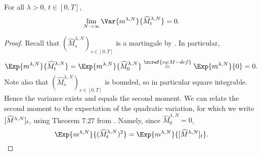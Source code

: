 \documentclass{article}
\begin{document}
\begin{proposition}\label{prop:vanishing-variance}  %
  For all $\lambda > 0$, $t \in [0,T]$,
  \begin{equation}
    \lim_{N\to\infty} \Var{\lawmu^{\lambda,N}}{\widehat{M}_t^{\lambda,N}} = 0.
  \end{equation}
\end{proposition}
\begin{proof}
  Recall that $(\widehat{M}_s^{\lambda,N})_{s\in[0,T]}$ is a martingale by .
  In particular,
  \begin{equation}
    \Exp{\lawmu^{\lambda,N}}{\widehat{M}_t^{\lambda,N}} = \Exp{\lawmu^{\lambda,N}}{\widehat{M}_0^{\lambda,N}}
    \overset{\zcref{eq:M-def}}{=} \Exp{\lawmu^{\lambda,N}}{0} = 0.
  \end{equation}
  Note also that $(\widehat{M}_s^{\lambda,N})_{s\in[0,T]}$ is bounded, so in particular square integrable.
  Hence the variance exists and equals the second moment.
  We can relate the second moment to the expectation of the quadratic variation, for which we write $[\widehat{M}^{\lambda,N}]_t$, using Theorem 7.27 from \cite[201]{klebanerIntroductionStochasticCalculus2012}.
  Namely, since $\widehat{M}_0^{\lambda,N} = 0$,
  \begin{equation}
    \Exp{\lawmu^{\lambda,N}}{(\widehat{M}_t^{\lambda,N})^2} = \Exp{\lawmu^{\lambda,N}}{\sbr{\widehat{M}^{\lambda,N}}_t}.
  \end{equation}


\end{proof}
\end{document}
